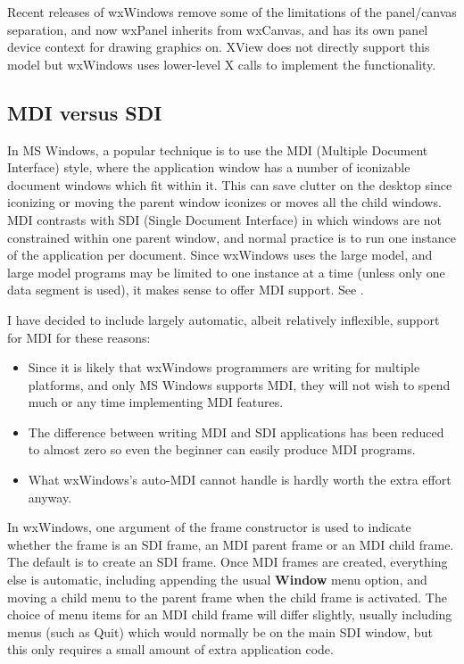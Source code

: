 Recent releases of wxWindows remove some of the limitations of
the panel/canvas separation, and now wxPanel inherits from
wxCanvas, and has its own panel device context for drawing
graphics on. XView does not directly support this model but
wxWindows uses lower-level X calls to implement the functionality.

\subsection{MDI versus SDI}\label{mdi}

In MS Windows, a popular technique is to use the MDI (Multiple Document
Interface) style, where the application window has a number of
iconizable document windows which fit within it. This can save clutter
on the desktop since iconizing or moving the parent window iconizes or
moves all the child windows. MDI contrasts with SDI (Single Document
Interface) in which windows are not constrained within one parent
window, and normal practice is to run one instance of the application
per document. Since wxWindows uses the large model, and large model
programs may be limited to one instance at a time (unless only one data
segment is used), it makes sense to offer MDI support. See
\rtfsp{}.

I have decided to include largely automatic, albeit relatively
inflexible, support for MDI for these reasons:

\begin{itemize}
\item Since it is likely that wxWindows programmers are writing for
multiple platforms, and only MS Windows supports MDI, they will not wish
to spend much or any time implementing MDI features.
\item The difference between writing MDI and SDI applications
has been reduced to almost zero so even the beginner
can easily produce MDI programs.
\item What wxWindows's auto-MDI cannot handle is hardly worth the extra
effort anyway.
\end{itemize}

In wxWindows, one argument of the frame constructor is used to
indicate whether the frame is an SDI frame, an MDI parent frame or an
MDI child frame. The default is to create an SDI frame. Once MDI
frames are created, everything else is automatic, including appending
the usual {\bf Window} menu option, and moving a child menu to the
parent frame when the child frame is activated.  The choice of menu
items for an MDI child frame will differ slightly, usually including
menus (such as Quit) which would normally be on the main SDI window,
but this only requires a small amount of extra application code.

